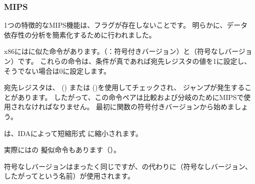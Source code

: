 ﻿\subsubsection{MIPS}

1つの特徴的なMIPS機能は、フラグが存在しないことです。 
明らかに、データ依存性の分析を簡素化するために行われました。


x86にはに似た命令があります。（：符号付きバージョン）と（符号なしバージョン）です。 
これらの命令は、条件が真であれば宛先レジスタの値を1に設定し、そうでない場合は0に設定します。


宛先レジスタは、 () または  ()を使用してチェックされ、
ジャンプが発生することがあります。 
したがって、この命令ペアは比較および分岐のためにMIPSで使用されなければなりません。
最初に関数の符号付きバージョンから始めましょう。



は、IDAによって短縮形式
に縮小されます。

実際にはの
擬似命令もあります（）。


符号なしバージョンはまったく同じですが、の代わりに（符号なしバージョン、したがってという名前）が使用されます。


